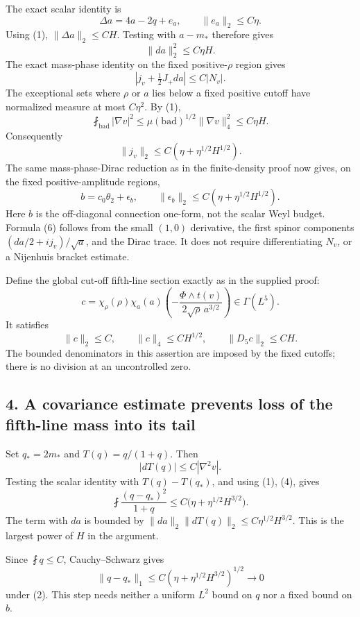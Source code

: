 \documentclass[
]{article}
\begin{document}
The exact scalar identity is \[
 \Delta a=4a-2q+e_a,\qquad \|e_a\|_2\le C\eta.
\] Using (1), \(\|\Delta a\|_2\le C H\). Testing with \(a-m_*\)
therefore gives \[
 \boxed{\|da\|_2^2\le C\eta H.} \tag{4}
\] The exact mass-phase identity on the fixed positive-\(\rho\) region
gives \[
 |j_v+\tfrac12J_+da|\le C|N_v|.
\] The exceptional sets where \(\rho\) or \(a\) lies below a fixed
positive cutoff have normalized measure at most \(C\eta^2\). By (1), \[
 \fint_{\mathrm{bad}}|\nabla v|^2
 \le \mu(\mathrm{bad})^{1/2}\|\nabla v\|_4^2
 \le C\eta H. \tag{5}
\] Consequently \[
 \|j_v\|_2\le C(\eta+\eta^{1/2}H^{1/2}).
\] The same mass-phase-Dirac reduction as in the finite-density proof
now gives, on the fixed positive-amplitude regions, \[
 b=c_0\theta_2+\epsilon_b,
 \qquad \|\epsilon_b\|_2\le C(\eta+\eta^{1/2}H^{1/2}). \tag{6}
\] Here \(b\) is the off-diagonal connection one-form, not the scalar
Weyl budget. Formula (6) follows from the small \((1,0)\) derivative,
the first spinor components \((da/2+ij_v)/\sqrt a\), and the Dirac
trace. It does not require differentiating \(N_v\), or a Nijenhuis
bracket estimate.

Define the global cut-off fifth-line section exactly as in the supplied
proof: \[
 c=\chi_\rho(\rho)\chi_a(a)
 \left(-\frac{\Phi\wedge t(v)}{2\sqrt\rho\,a^{3/2}}\right)\in\Gamma(L^5).
\] It satisfies \[
 \|c\|_2\le C,\qquad \|c\|_4\le C H^{1/2},
 \qquad \|D_5c\|_2\le C H. \tag{7}
\] The bounded denominators in this assertion are imposed by the fixed
cutoffs; there is no division at an uncontrolled zero.

\hypertarget{a-covariance-estimate-prevents-loss-of-the-fifth-line-mass-into-its-tail}{%
\subsection{4. A covariance estimate prevents loss of the fifth-line
mass into its
tail}\label{a-covariance-estimate-prevents-loss-of-the-fifth-line-mass-into-its-tail}}

Set \(q_*=2m_*\) and \(T(q)=q/(1+q)\). Then \[
 |dT(q)|\le C|\nabla^2v|.
\] Testing the scalar identity with \(T(q)-T(q_*)\), and using (1), (4),
gives \[
 \boxed{\fint\frac{(q-q_*)^2}{1+q}
 \le C\bigl(\eta+\eta^{1/2}H^{3/2}\bigr).} \tag{8}
\] The term with \(da\) is bounded by
\(\|da\|_2\|dT(q)\|_2\le C\eta^{1/2}H^{3/2}\). This is the largest power
of \(H\) in the argument.

Since \(\fint q\le C\), Cauchy--Schwarz gives \[
 \|q-q_*\|_1
 \le C\left(\eta+\eta^{1/2}H^{3/2}\right)^{1/2}\longrightarrow0 \tag{9}
\] under (2). This step needs neither a uniform \(L^2\) bound on \(q\)
nor a fixed bound on \(b\).
\end{document}
